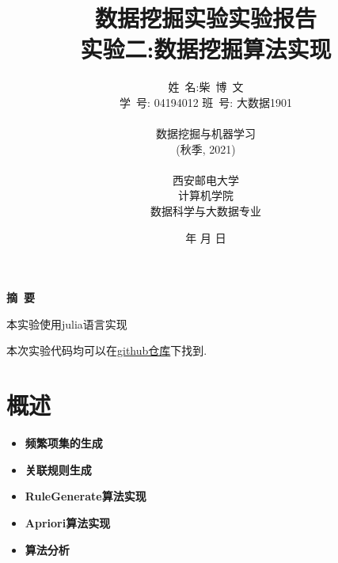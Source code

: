 \documentclass[a4paper]{article}
\begin{document}
\renewcommand{\contentsname}{目\ 录}
\renewcommand{\appendixname}{附录}
\renewcommand{\appendixpagename}{附录}
\renewcommand{\refname}{参考文献}
\renewcommand{\figurename}{图}
\renewcommand{\tablename}{表}
\renewcommand{\today}{\number\year 年 \number\month 月 \number\day 日}

\title{{\Huge 数据挖掘实验实验报告{\large\linebreak\\}}{\Large 实验二:数据挖掘算法实现\linebreak\linebreak}}
\author{
    姓\ 名:柴\ 博\ 文\\
    学\ 号: 04194012\newline
    班\ 号: 大数据1901\\\\
    数据挖掘与机器学习\\
    (秋季, 2021)\\\\
    西安邮电大学\\
    计算机学院\\
    数据科学与大数据专业}
\date{\today}
\maketitle
\newpage

\begin{center}
    {\Large\bf{摘\ 要\\}}
\end{center}

本实验使用julia语言实现

本次实验代码均可以在\href{https://github.com/lovebaihezi/lab/tree/main/data-process/lab2}{github仓库}下找到.

\newpage
\begin{center}
    \tableofcontents\label{c}
\end{center}
\newpage

\section{概述} \label{overview}

\begin{itemize}
    \item{\textbf{频繁项集的生成}}
    \item{\textbf{关联规则生成}}
    \item{\textbf{RuleGenerate算法实现}}
    \item{\textbf{Apriori算法实现}}
    \item{\textbf{算法分析}}
\end{itemize}
\end{document}
